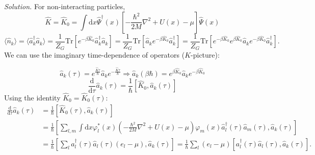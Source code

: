 \documentclass[11pt, a4paper]{article}
\newcommand{\dd}{\mathrm{d}}
\newcommand{\Tr}[1]{\mathrm{Tr}\left[#1\right]}
\begin{document}
\begin{enumerate}
    \par \textit{Solution.}
    For non-interacting particles,
    \begin{equation*}
        \hat K = \hat K_0 = \int\dd x \hat\Psi^{\dagger}(x)\left[ -\frac{\hbar^2}{2M}\nabla^2 + U(x) - \mu \right]\hat\Psi(x)
    \end{equation*}
    \begin{equation*}
        \langle \hat n_k \rangle = \langle \hat a_k^{\dagger}\hat a_k \rangle
        = \frac{1}{Z_G}\Tr{e^{-\beta \hat K_0}\hat a_k^{\dagger}\hat a_k} 
        = \frac{1}{Z_G}\Tr{\hat a_ke^{-\beta \hat K_0}\hat a_k^{\dagger}}
        = \frac{1}{Z_G}\Tr{e^{-\beta \hat K_0}e^{\beta \hat K_0}\hat a_ke^{-\beta \hat K_0}\hat a_k^{\dagger}}.
    \end{equation*}
    We can use the imaginary time-dependence of operators ($K$-picture):
    

    \begin{equation*}
        \hat a_k(\tau) = e^{\frac{\hat K\tau}{\hbar}}\hat a_k e^{-\frac{\hat K\tau}{\hbar}}
        \Longrightarrow
        \hat a_k(\beta\hbar) = e^{\beta \hat K_0}\hat a_ke^{-\beta \hat K_0}
    \end{equation*}
    \begin{equation*}
        \frac{\dd}{\dd\tau}\hat a_k(\tau) = \frac{1}{\hbar}[\hat K_0, \hat a_k(\tau)]
    \end{equation*}
    Using the identity $\hat K_0 = \hat K_0(\tau)$:
    \begin{align*}
        \frac{\dd}{\dd\tau}\hat a_k(\tau) &= \frac{1}{\hbar}[\hat K_0(\tau), \hat a_k(\tau)]\\
        & = \frac{1}{\hbar}\left[\sum\limits_{l,m}\int\dd x \varphi^*_l(x) \left(-\frac{\hbar^2}{2M}\nabla^2 + U(x) - \mu\right)
        \varphi_m(x)\hat a_l^{\dagger}(\tau)\hat a_m(\tau), \hat a_k(\tau) \right] \\
        & = \frac{1}{\hbar}\left[\sum\limits_{l}a_l^{\dagger}(\tau)\hat a_l(\tau) (e_l - \mu), \hat a_k(\tau)\right]
        = \frac{1}{\hbar}\sum\limits_{l}(e_l - \mu) \left[a_l^{\dagger}(\tau)\hat a_l(\tau), \hat a_k(\tau)\right].
    \end{align*}
    

\end{enumerate}
\end{document}
